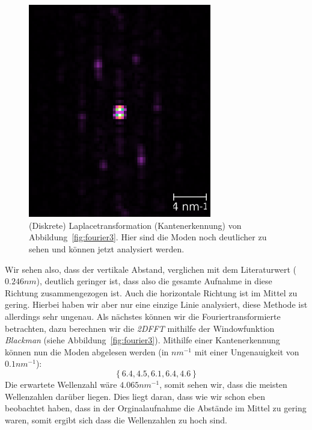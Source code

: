 \begin{figure}  
    \includegraphics[width=8cm]{pics/fourier4}
    \caption{(Diskrete) Laplacetransformation (Kantenerkennung)
        von Abbildung~\ref{fig:fourier3}. Hier
    sind die Moden noch deutlicher zu sehen und können jetzt analysiert werden.}
\label{fig:fourier4}
\end{figure}
Wir sehen also, dass der vertikale Abstand, verglichen mit dem Literaturwert ($0.246nm$), deutlich
geringer ist, dass also die gesamte Aufnahme in diese Richtung zusammengezogen ist. 
Auch die horizontale Richtung ist im Mittel zu gering. Hierbei haben wir aber nur eine einzige
Linie analysiert, diese Methode ist allerdings sehr ungenau. 
Als nächstes können wir die Fouriertransformierte betrachten, dazu
berechnen wir die \textit{2DFFT} mithilfe der Windowfunktion \textit{Blackman} 
(siehe Abbildung~\ref{fig:fourier3}). Mithilfe einer Kantenerkennung können nun die Moden
abgelesen werden (in $nm^{-1}$ mit einer Ungenauigkeit von $0.1nm^{-1}$):
\begin{equation}
 \left \{ 6.4, 4.5, 6.1, 6.4, 4.6 \right \} 
\end{equation}
Die erwartete Wellenzahl wäre $4.065 nm^{-1}$, somit sehen wir, dass die meisten
Wellenzahlen darüber liegen. Dies liegt daran, dass wie wir schon eben beobachtet haben, dass
in der Orginalaufnahme die Abstände im Mittel zu gering waren, somit ergibt sich dass die 
Wellenzahlen zu hoch sind.



\clearpage
